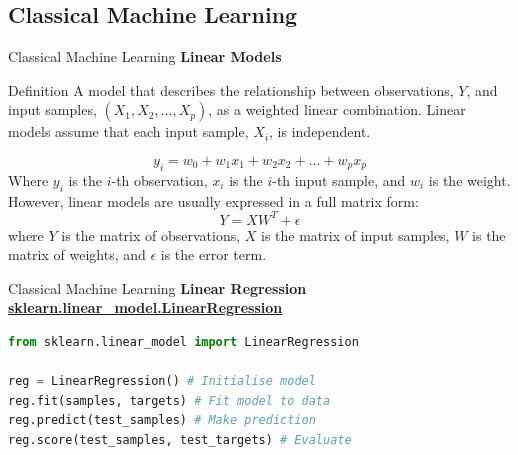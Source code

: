 \documentclass{beamer}
\begin{document}
\subsection{Classical Machine Learning}
\begin{frame}[fragile]{Classical Machine Learning}
    \vspace{-0.5cm}
    \textbf{Linear Models}
    \begin{block}{Definition}
        A model that describes the relationship between observations, $Y$, and input samples, $(X_1, X_2,..., X_p)$, as a weighted linear combination. Linear models assume that each input sample, $X_i$, is independent.
    \end{block}
    \vspace{-1cm}
    \begin{equation}
        y_i = w_0 + w_1 x_1 + w_2 x_2 + ... + w_p x_p
    \end{equation}
    Where $y_i$ is the $i$-th observation, $x_i$ is the $i$-th input sample, and $w_i$ is the weight.
    However, linear models are usually expressed in a full matrix form:
    \begin{equation}
        \label{eq:2}
        Y = XW^T + \epsilon
    \end{equation}
    where $Y$ is the matrix of observations, $X$ is the matrix of input samples, $W$ is the matrix of weights, and $\epsilon$ is the error term.
\end{frame}
\begin{frame}[fragile]{Classical Machine Learning}
    \textbf{Linear Regression}
    \href{https://scikit-learn.org/stable/modules/generated/sklearn.linear_model.LinearRegression.html}{\textbf{\underline{sklearn.linear\_model.LinearRegression}}}
    \begin{example}
        \begin{lstlisting}[language=Python]
from sklearn.linear_model import LinearRegression

reg = LinearRegression() # Initialise model
reg.fit(samples, targets) # Fit model to data
reg.predict(test_samples) # Make prediction
reg.score(test_samples, test_targets) # Evaluate
        \end{lstlisting}
    \end{example}
\end{frame}
\end{document}
